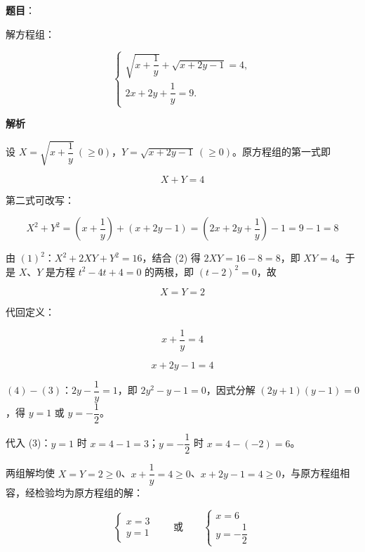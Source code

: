 \begin{answer}

\textbf{题目}：

解方程组：

\nopagebreak[4]
\[
\begin{cases}
\sqrt{x+\dfrac1y}+\sqrt{x+2y-1}=4,\\[4pt]
2x+2y+\dfrac1y=9.
\end{cases}
\]

\textbf{解析}

设 $X=\sqrt{x+\dfrac1y}\ (\ge0)$，$Y=\sqrt{x+2y-1}\ (\ge0)$。原方程组的第一式即

\nopagebreak[4]
\[
X+Y=4\tag{1}
\]

第二式可改写：

\nopagebreak[4]
\[
X^2+Y^2=\left(x+\frac1y\right)+(x+2y-1)=\left(2x+2y+\frac1y\right)-1=9-1=8\tag{2}
\]

由 $(1)^2$：$X^2+2XY+Y^2=16$，结合 (2) 得 $2XY=16-8=8$，即 $XY=4$。于是 $X$、$Y$ 是方程 $t^2-4t+4=0$ 的两根，即 $(t-2)^2=0$，故

\nopagebreak[4]
\[
X=Y=2
\]

代回定义：

\nopagebreak[4]
\[
x+\frac1y=4\tag{3}
\]

\nopagebreak[4]
\[
x+2y-1=4\tag{4}
\]

$(4)-(3)$：$2y-\dfrac1y=1$，即 $2y^2-y-1=0$，因式分解 $(2y+1)(y-1)=0$，得 $y=1$ 或 $y=-\dfrac12$。

代入 (3)：$y=1$ 时 $x=4-1=3$；$y=-\dfrac12$ 时 $x=4-(-2)=6$。

两组解均使 $X=Y=2\ge0$、$x+\dfrac1y=4\ge0$、$x+2y-1=4\ge0$，与原方程组相容，经检验均为原方程组的解：

\nopagebreak[4]
\[
\begin{cases}x=3\\y=1\end{cases}\qquad\text{或}\qquad\begin{cases}x=6\\y=-\dfrac12\end{cases}
\]


\end{answer}

